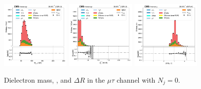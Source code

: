 \begin{figure}[htb!]
    \centering
    \includegraphics[width=0.3\textwidth]{chapters/Appendix/sectionPlots/figures/data_mc_overlays/mutau_2016_cat_eq0_eq0_signal_linear_lepton_dilepton1_mass}
    \includegraphics[width=0.3\textwidth]{chapters/Appendix/sectionPlots/figures/data_mc_overlays/mutau_2016_cat_eq0_eq0_signal_linear_lepton_dilepton1_pt}
    \includegraphics[width=0.3\textwidth]{chapters/Appendix/sectionPlots/figures/data_mc_overlays/mutau_2016_cat_eq0_eq0_signal_linear_lepton_dilepton1_delta_r}
    \caption{Dielectron mass, \pt, and $\Delta R$ in the $\mu\tau$ channel
    with $N_{j} = 0$.}
    \label{fig:mutau_1_dilepton}
\end{figure}

